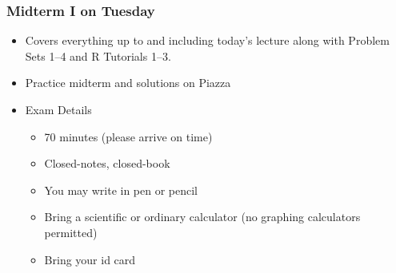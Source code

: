\documentclass[handout]{beamer}
\begin{document}





\begin{frame}
\frametitle{Midterm I on Tuesday}

\begin{itemize}
	\item Covers everything up to and including today's lecture along with Problem Sets 1--4 and R Tutorials 1--3.
	\item Practice midterm and solutions on Piazza
	\item Exam Details
		\begin{itemize}
			\item 70 minutes (please arrive on time)
			\item Closed-notes, closed-book
			\item You may write in pen or pencil
			\item Bring a scientific or ordinary calculator (no graphing calculators permitted)
			\item Bring your id card
		\end{itemize}
\end{itemize}


\end{frame}
\end{document}
